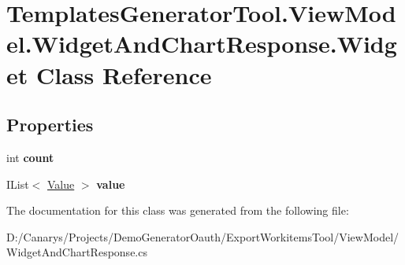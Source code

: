 \hypertarget{class_templates_generator_tool_1_1_view_model_1_1_widget_and_chart_response_1_1_widget}{}\section{Templates\+Generator\+Tool.\+View\+Model.\+Widget\+And\+Chart\+Response.\+Widget Class Reference}
\label{class_templates_generator_tool_1_1_view_model_1_1_widget_and_chart_response_1_1_widget}
\subsection*{Properties}
\begin{DoxyCompactItemize}
\item 
\mbox{\label{class_templates_generator_tool_1_1_view_model_1_1_widget_and_chart_response_1_1_widget_ae41b9ab8da5844b6d2aa0752b6e755ea}} 
int {\bfseries count}
\item 
\mbox{\label{class_templates_generator_tool_1_1_view_model_1_1_widget_and_chart_response_1_1_widget_acebd461467fe27052945cb1cfbbcc1a3}} 
I\+List$<$ \mbox{\hyperlink{class_templates_generator_tool_1_1_view_model_1_1_widget_and_chart_response_1_1_value}{Value}} $>$ {\bfseries value}
\end{DoxyCompactItemize}


The documentation for this class was generated from the following file\+:\begin{DoxyCompactItemize}
\item 
D\+:/\+Canarys/\+Projects/\+Demo\+Generator\+Oauth/\+Export\+Workitems\+Tool/\+View\+Model/Widget\+And\+Chart\+Response.\+cs\end{DoxyCompactItemize}

